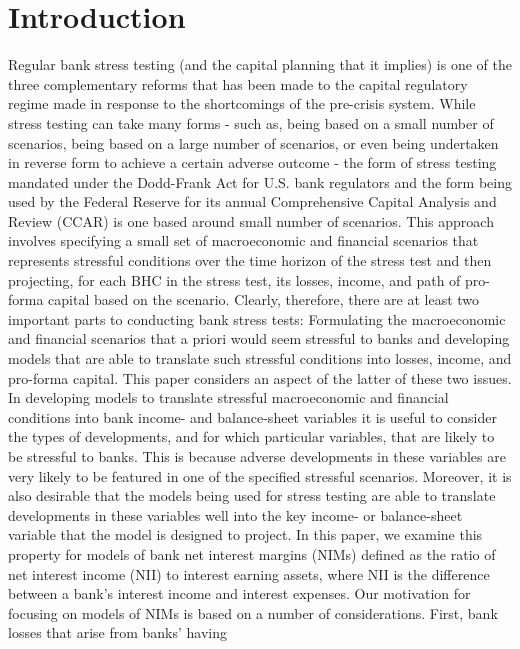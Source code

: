 \documentclass[12pt]{article}
\begin{document}
\section{\protect\normalsize Introduction}

{\normalsize Regular bank stress testing (and the capital planning that it
implies) is one of the three complementary reforms that has been made to the
capital regulatory regime made in response to the shortcomings of the
pre-crisis system. While stress testing can take many forms - such as, being
based on a small number of scenarios, being based on a large number of
scenarios, or even being undertaken in reverse form to achieve a certain
adverse outcome - the form of stress testing mandated under the Dodd-Frank
Act for U.S. bank regulators and the form being used by the Federal Reserve
for its annual Comprehensive Capital Analysis and Review (CCAR) is one based
around small number of scenarios. This approach involves specifying a small
set of macroeconomic and financial scenarios that represents stressful
conditions over the time horizon of the stress test and then projecting, for
each BHC in the stress test, its losses, income, and path of pro-forma
capital based on the scenario. Clearly, therefore, there are at least two
important parts to conducting bank stress tests: Formulating the
macroeconomic and financial scenarios that a priori would seem stressful to
banks and developing models that are able to translate such stressful
conditions into losses, income, and pro-forma capital. This paper considers
an aspect of the latter of these two issues. In developing models to
translate stressful macroeconomic and financial conditions into bank income-
and balance-sheet variables it is useful to consider the types of
developments, and for which particular variables, that are likely to be
stressful to banks. This is because adverse developments in these variables
are very likely to be featured in one of the specified stressful scenarios.
Moreover, it is also desirable that the models being used for stress testing
are able to translate developments in these variables well into the key
income- or balance-sheet variable that the model is designed to project. In
this paper, we examine this property for models of bank net interest margins
(NIMs) defined as the ratio of net interest income (NII) to interest earning
assets, where NII is the difference between a bank's interest income and
interest expenses. Our motivation for focusing on models of NIMs is based on
a number of considerations. First, bank losses that arise from banks' having
}
\end{document}
